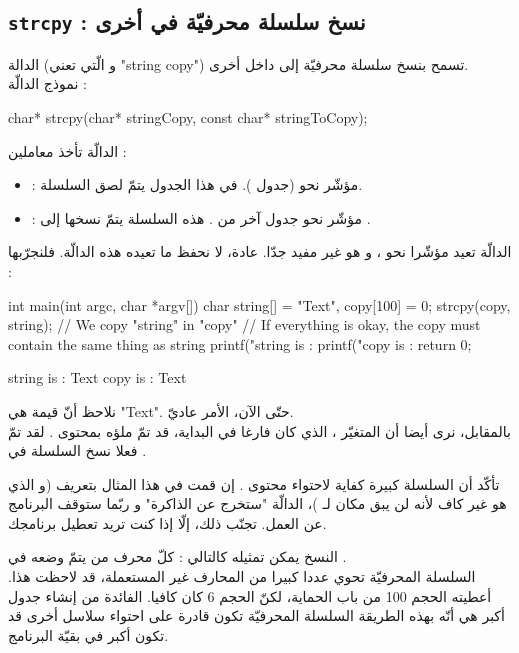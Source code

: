 \subsection{\texttt{strcpy} : نسخ سلسلة محرفيّة في أخرى}
الدالة
(و الّتي تعني "\textenglish{string copy}")
تسمح بنسخ سلسلة محرفيّة إلى داخل أخرى.\\
نموذج الدالّة :
\begin{Csource}
char* strcpy(char* stringCopy, const char* stringToCopy);
\end{Csource}
الدالّة تأخذ معاملين :
\begin{itemize}
  \item {} : مؤشّر نحو  (جدول ). في هذا الجدول يتمّ لصق السلسلة.
  \item {} : مؤشّر نحو جدول آخر من . هذه السلسلة يتمّ نسخها إلى .
\end{itemize}
الدالّة تعيد مؤشّرا نحو
،
و هو غير مفيد جدّا. عادة، لا نحفظ ما تعيده هذه الدالّة. فلنجرّبها :
\begin{Csource}
int main(int argc, char *argv[])
{
	char string[] = "Text", copy[100] = {0};
	strcpy(copy, string); // We copy "string" in "copy"
	// If everything is okay, the copy must contain the same thing as string
	printf("string is : %
	printf("copy  is : %
	return 0;
}
\end{Csource}
\begin{Console}
string is : Text
copy is : Text
\end{Console}
نلاحظ أنّ قيمة
هي
"\textenglish{Text}".
حتّى الآن، الأمر عاديّ.\\
بالمقابل، نرى أيضا أن المتغيّر
،
الذي كان فارغا في البداية، قد تمّ ملؤه بمحتوى
.
لقد تمّ فعلا نسخ السلسلة في
.
\begin{warning}
  تأكّد أن السلسلة
  كبيرة كفاية لاحتواء محتوى
  .
  إن قمت في هذا المثال بتعريف
  (و الذي هو غير كاف لأنه لن يبق مكان لـ
  )،
  الدالّة
  "ستخرج عن الذاكرة" و ربّما ستوقف البرنامج عن العمل. تجنّب ذلك، إلّا إذا كنت تريد تعطيل برنامجك.
\end{warning}
النسخ يمكن تمثيله كالتالي :
كلّ محرف من
يتمّ وضعه في
.\\
السلسلة المحرفيّة
تحوي عددا كبيرا من المحارف غير المستعملة، قد لاحظت هذا. أعطيته الحجم 100 من باب الحماية، لكنّ الحجم 6 كان كافيا.
الفائدة من إنشاء جدول أكبر هي أنّه بهذه الطريقة السلسلة المحرفيّة
تكون قادرة على احتواء سلاسل أخرى قد تكون أكبر في بقيّة البرنامج.

